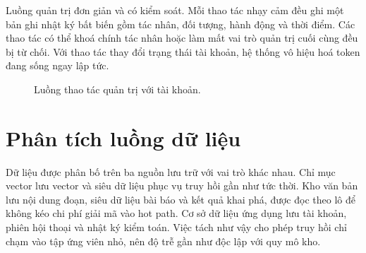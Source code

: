 Luồng quản trị đơn giản và có kiểm soát. Mỗi thao tác nhạy cảm đều ghi một bản ghi nhật ký bất biến gồm tác nhân, đối tượng, hành động và thời điểm. Các thao tác có thể khoá chính tác nhân hoặc làm mất vai trò quản trị cuối cùng đều bị từ chối. Với thao tác thay đổi trạng thái tài khoản, hệ thống vô hiệu hoá token đang sống ngay lập tức.

\begin{figure}[htbp]
    \centering
    \caption{Luồng thao tác quản trị với tài khoản.}
    \label{fig:luong-quan-tri}
\end{figure}

\section{Phân tích luồng dữ liệu}
\label{sec:luong-du-lieu}

Dữ liệu được phân bố trên ba nguồn lưu trữ với vai trò khác nhau. Chỉ mục vector lưu vector và siêu dữ liệu phục vụ truy hồi gần như tức thời. Kho văn bản lưu nội dung đoạn, siêu dữ liệu bài báo và kết quả khai phá, được đọc theo lô để không kéo chi phí giải mã vào hot path. Cơ sở dữ liệu ứng dụng lưu tài khoản, phiên hội thoại và nhật ký kiểm toán. Việc tách như vậy cho phép truy hồi chỉ chạm vào tập ứng viên nhỏ, nên độ trễ gần như độc lập với quy mô kho.

